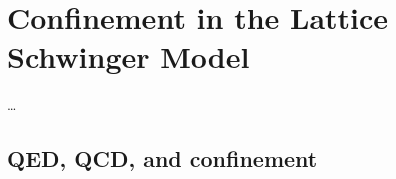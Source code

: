 \documentclass[../main.tex]{subfiles} %
\begin{document}
\chapter{Confinement in the Lattice Schwinger Model} \label{chap:Confinement}

\ldots



\section{QED, QCD, and confinement}

\lipsum[1-2]
\end{document}
